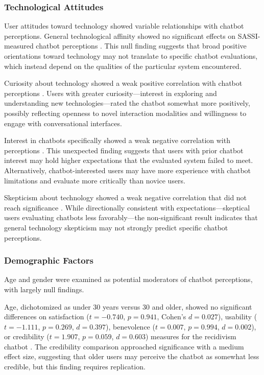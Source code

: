\documentclass[manuscript,anonymous,sigconf]{acmart}
\begin{document}
\subsubsection{Technological Attitudes}

User attitudes toward technology showed variable relationships with chatbot perceptions. General technological affinity showed no significant effects on SASSI-measured chatbot perceptions \cite{A13}. This null finding suggests that broad positive orientations toward technology may not translate to specific chatbot evaluations, which instead depend on the qualities of the particular system encountered.

Curiosity about technology showed a weak positive correlation with chatbot perceptions \cite{A13}. Users with greater curiosity---interest in exploring and understanding new technologies---rated the chatbot somewhat more positively, possibly reflecting openness to novel interaction modalities and willingness to engage with conversational interfaces.

Interest in chatbots specifically showed a weak negative correlation with perceptions \cite{A13}. This unexpected finding suggests that users with prior chatbot interest may hold higher expectations that the evaluated system failed to meet. Alternatively, chatbot-interested users may have more experience with chatbot limitations and evaluate more critically than novice users.

Skepticism about technology showed a weak negative correlation that did not reach significance \cite{A13}. While directionally consistent with expectations---skeptical users evaluating chatbots less favorably---the non-significant result indicates that general technology skepticism may not strongly predict specific chatbot perceptions.

\subsubsection{Demographic Factors}

Age and gender were examined as potential moderators of chatbot perceptions, with largely null findings.

Age, dichotomized as under 30 years versus 30 and older, showed no significant differences on satisfaction ($t = -0.740$, $p = 0.941$, Cohen's $d = 0.027$), usability ($t = -1.111$, $p = 0.269$, $d = 0.397$), benevolence ($t = 0.007$, $p = 0.994$, $d = 0.002$), or credibility ($t = 1.907$, $p = 0.059$, $d = 0.603$) measures for the recidivism chatbot \cite{A54}. The credibility comparison approached significance with a medium effect size, suggesting that older users may perceive the chatbot as somewhat less credible, but this finding requires replication.
\end{document}
